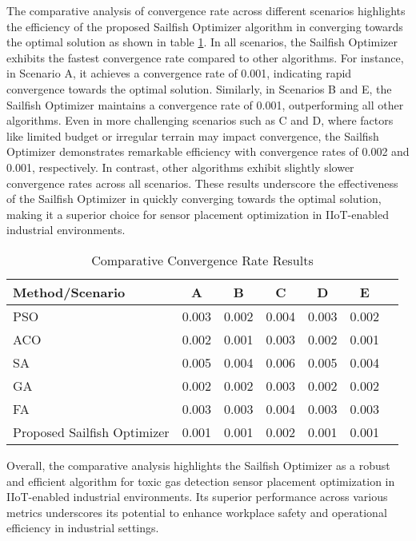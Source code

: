 \documentclass[conference]{IEEEtran}
\begin{document}
The comparative analysis of convergence rate across different scenarios highlights the efficiency of the proposed Sailfish Optimizer algorithm in converging towards the optimal solution as shown in table \ref{tab:convergence_rate_comparison}. In all scenarios, the Sailfish Optimizer exhibits the fastest convergence rate compared to other algorithms. For instance, in Scenario A, it achieves a convergence rate of 0.001, indicating rapid convergence towards the optimal solution. Similarly, in Scenarios B and E, the Sailfish Optimizer maintains a convergence rate of 0.001, outperforming all other algorithms. Even in more challenging scenarios such as C and D, where factors like limited budget or irregular terrain may impact convergence, the Sailfish Optimizer demonstrates remarkable efficiency with convergence rates of 0.002 and 0.001, respectively. In contrast, other algorithms exhibit slightly slower convergence rates across all scenarios. These results underscore the effectiveness of the Sailfish Optimizer in quickly converging towards the optimal solution, making it a superior choice for sensor placement optimization in IIoT-enabled industrial environments.
\begin{table}[htbp]
\centering
\caption{Comparative Convergence Rate Results}
\label{tab:convergence_rate_comparison}
\begin{tabular}{lcccccc}
\toprule
\textbf{Method/Scenario} & \textbf{A} & \textbf{B} & \textbf{C} & \textbf{D} & \textbf{E} \\
\midrule
PSO & 0.003 & 0.002 & 0.004 & 0.003 & 0.002 \\
ACO & 0.002 & 0.001 & 0.003 & 0.002 & 0.001 \\
SA & 0.005 & 0.004 & 0.006 & 0.005 & 0.004 \\
GA & 0.002 & 0.002 & 0.003 & 0.002 & 0.002 \\
FA& 0.003 & 0.003 & 0.004 & 0.003 & 0.003 \\
Proposed Sailfish Optimizer & 0.001 & 0.001 & 0.002 & 0.001 & 0.001 \\
\bottomrule
\end{tabular}
\end{table}
Overall, the comparative analysis highlights the Sailfish Optimizer as a robust and efficient algorithm for toxic gas detection sensor placement optimization in IIoT-enabled industrial environments. Its superior performance across various metrics underscores its potential to enhance workplace safety and operational efficiency in industrial settings.
\end{document}
